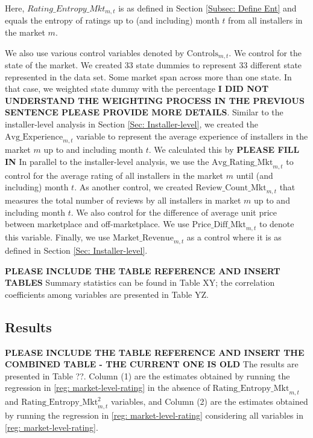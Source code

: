 \documentclass[msom,blindrev]{informs3}
\begin{document}
Here, $Rating\_Entropy\_Mkt_{m,t}$ is as defined in Section \ref{Subsec: Define Ent} and equals the entropy of ratings up to (and including) month $t$ from all installers in the market $m$.

We also use various control variables denoted by $\text{Controls}_{m,t}$. We control for the state of the market. We created 33 state dummies to represent 33 different state represented in the data set. Some market span across more than one state. In that case, we weighted state dummy with the percentage \textbf{I DID NOT UNDERSTAND THE WEIGHTING PROCESS IN THE PREVIOUS SENTENCE PLEASE PROVIDE MORE DETAILS}. Similar to the installer-level analysis in Section \ref{Sec: Installer-level}, we created the $\text{Avg\_Experience}_{m,t}$ variable to represent the average experience of installers in the market $m$ up to and including month $t$. We calculated this by \textbf{PLEASE FILL IN} In parallel to the installer-level analysis, we use the $\text{Avg\_Rating\_Mkt}_{m,t}$ to control for the average rating of all installers in the market $m$ until (and including) month $t$. As another control, we created $\text{Review\_Count\_Mkt}_{m,t}$ that measures the total number of reviews by all installers in market $m$ up to and including month $t$. We also control for the difference of average unit price between marketplace and off-marketplace. We use $\text{Price\_Diff\_Mkt}_{m,t}$ to denote this variable. Finally, we use $\text{Market\_Revenue}_{m,t}$ as a control where it is as defined in Section \ref{Sec: Installer-level}.

\textbf{PLEASE INCLUDE THE TABLE REFERENCE AND INSERT TABLES} Summary statistics can be found in Table XY; the correlation coefficients among variables are presented in Table YZ.

\subsection{Results}


\textbf{PLEASE INCLUDE THE TABLE REFERENCE AND INSERT THE COMBINED TABLE - THE CURRENT ONE IS OLD} The results are presented in Table ??. Column (1) are the estimates obtained by running the regression in \eqref{reg: market-level-rating} in the absence of $\text{Rating\_Entropy\_Mkt}_{m,t}$ and $\text{Rating\_Entropy\_Mkt}^2_{m,t}$ variables, and  Column (2) are the estimates obtained by running the regression in \eqref{reg: market-level-rating} considering all variables in \eqref{reg: market-level-rating}.
\end{document}
